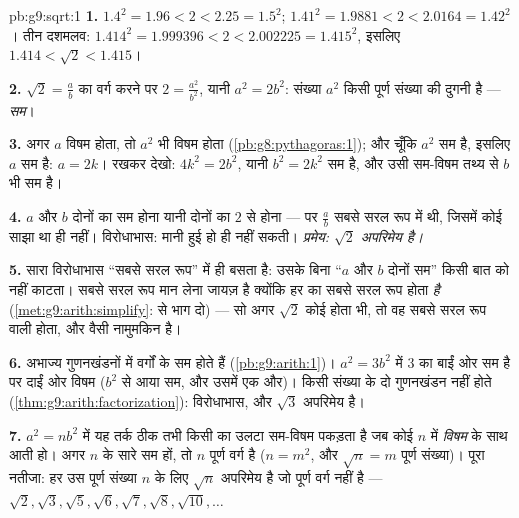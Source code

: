 \begin{solution}{pb:g9:sqrt:1}
\textbf{1.} $1.4^2 = 1.96 < 2 < 2.25 = 1.5^2$;
$1.41^2 = 1.9881 < 2 < 2.0164 = 1.42^2$। तीन दशमलव:
$1.414^2 = 1.999396 < 2 < 2.002225 = 1.415^2$, इसलिए
$1.414 < \sqrt2 < 1.415$।

\textbf{2.} $\sqrt2 = \frac ab$ का वर्ग करने पर
$2 = \frac{a^2}{b^2}$, यानी $a^2 = 2b^2$: संख्या $a^2$ किसी पूर्ण
संख्या की दुगनी है --- \emph{सम}।

\textbf{3.} अगर $a$ विषम होता, तो $a^2$ भी विषम होता
(\cref{pb:g8:pythagoras:1}); और चूँकि $a^2$ सम है, इसलिए $a$ सम है:
$a = 2k$। रखकर देखो: $4k^2 = 2b^2$, यानी $b^2 = 2k^2$ सम है, और उसी
सम-विषम तथ्य से $b$ भी सम है।

\textbf{4.} $a$ और $b$ दोनों का सम होना यानी दोनों का $2$ से 
होना --- पर $\frac ab$ सबसे सरल रूप में थी, जिसमें कोई साझा  था
ही नहीं। विरोधाभास: मानी हुई  हो ही नहीं सकती।
\emph{प्रमेय: $\sqrt2$ अपरिमेय है।}

\textbf{5.} सारा विरोधाभास ``सबसे सरल रूप'' में ही बसता है: उसके
बिना ``$a$ और $b$ दोनों सम'' किसी बात को नहीं काटता। सबसे सरल रूप
मान लेना जायज़ है क्योंकि हर  का सबसे सरल रूप होता \emph{है}
(\cref{met:g9:arith:simplify}:  से भाग दो) --- सो
अगर $\sqrt2$ कोई  होता भी, तो वह सबसे सरल रूप वाली  होता,
और वैसी  नामुमकिन है।

\textbf{6.} अभाज्य गुणनखंडनों में वर्गों के  सम होते हैं
(\cref{pb:g9:arith:1})। $a^2 = 3b^2$ में $3$ का  बाईं ओर सम है
पर दाईं ओर विषम ($b^2$ से आया सम, और उसमें एक और)। किसी संख्या के दो
गुणनखंडन नहीं होते (\cref{thm:g9:arith:factorization}): विरोधाभास,
और $\sqrt3$ अपरिमेय है।

\textbf{7.} $a^2 = n b^2$ में यह तर्क ठीक तभी किसी  का
उलटा सम-विषम पकड़ता है जब कोई  $n$ में \emph{विषम}
 के साथ आती हो। अगर $n$ के सारे  सम हों, तो $n$ पूर्ण
वर्ग है ($n = m^2$, और $\sqrt n = m$ पूर्ण संख्या)। पूरा नतीजा: हर
उस पूर्ण संख्या $n$ के लिए $\sqrt n$ अपरिमेय है जो पूर्ण वर्ग नहीं
है --- $\sqrt2, \sqrt3, \sqrt5, \sqrt6, \sqrt7, \sqrt8, \sqrt{10},
\dots$


\end{solution}
